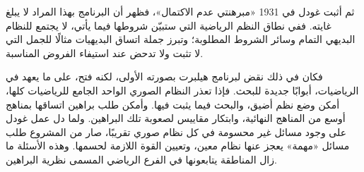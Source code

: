 \documentclass[../../../include/open-logic-section]{subfiles}
\begin{document}
ثم أثبت غودل في 1931 «مبرهنتي عدم الاكتمال»، فظهر أن
البرنامج بهذا المراد لا يبلغ غايته. ففي نطاق النظم الرياضية
التي ستبيّن شروطها فيما يأتي، لا يجتمع للنظام البديهي التمام
وسائر الشروط المطلوبة؛ وتبرز جملة اتساق البديهيات مثالًا
للجمل التي لا تثبت ولا تدحض عند استيفاء الفروض المناسبة.

فكان في ذلك نقض لبرنامج هيلبرت بصورته الأولى، لكنه فتح،
على ما يعهد في الرياضيات، أبوابًا جديدة للبحث. فإذا تعذر
النظام الصوري الواحد الجامع للرياضيات كلها، أمكن وضع نظم
أضيق، والبحث فيما يثبت فيها. وأمكن طلب براهين اتساقها
بمناهج أوسع من المناهج النهائية، وابتكار مقاييس لصعوبة
تلك البراهين. ولما دل عمل غودل على وجود مسائل غير محسومة
في كل نظام صوري تقريبًا، صار من المشروع طلب مسائل «مهمة»
يعجز عنها نظام معين، وتعيين القوة اللازمة لحسمها.
وهذه الأسئلة ما زال المناطقة يتابعونها في الفرع الرياضي
المسمى نظرية البراهين.
\end{document}
